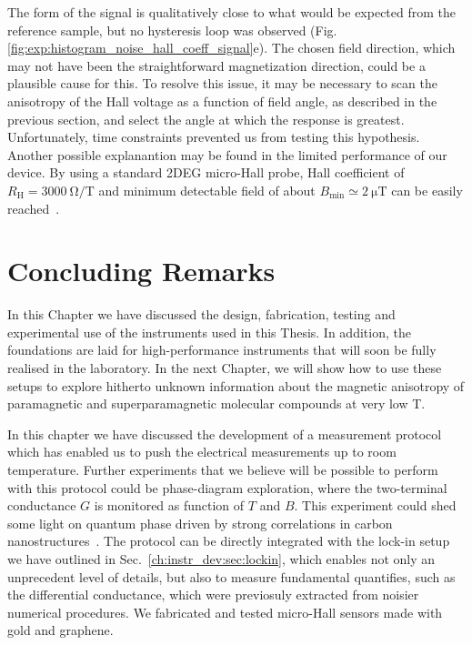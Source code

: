 %
The form of the signal is qualitatively close to what would be expected from the reference sample, but no hysteresis loop was observed (Fig.\ref{fig:exp:histogram_noise_hall_coeff_signal}e). The chosen field direction, which may not have been the straightforward magnetization direction, could be a plausible cause for this. To resolve this issue, it may be necessary to scan the anisotropy of the Hall voltage as a function of field angle, as described in the previous section, and select the angle at which the response is greatest. Unfortunately, time constraints prevented us from testing this hypothesis. Another possible explanantion may be found in the limited performance of our device. By using a standard 2DEG micro-Hall probe, Hall coefficient of $R_\textrm{H}=\SI{3000}{\ohm\per\tesla}$ and minimum detectable field of about $B_\textrm{min}\simeq\SI{2}{\micro\tesla}$ can be easily reached~\cite{candini2007phd}.

\section{Concluding Remarks}

In this Chapter we have discussed the design, fabrication, testing and experimental
use of the instruments used in this Thesis. In addition, the foundations are laid for
high-performance instruments that will soon be fully realised in the laboratory. In
the next Chapter, we will show how to use these setups to explore hitherto unknown
information about the magnetic anisotropy of paramagnetic and superparamagnetic
molecular compounds at very low T.

In this chapter we have discussed the development of a measurement protocol which has enabled us to push the electrical measurements up to room temperature. Further experiments that we believe  will be possible to perform with this protocol could be phase-diagram exploration, where the two-terminal conductance $G$ is monitored as function of $T$ and $B$. This experiment could shed some light on quantum phase driven by strong correlations in carbon nanostructures~\cite{paschen2021quantum, kim2017tunable, yankowitz2019tuning, kotov2012electron}. The protocol can be directly integrated with the lock-in setup we have outlined in Sec.~\ref{ch:instr_dev:sec:lockin}, which enables not only an unprecedent level of details, but also to measure fundamental quantifies, such as the differential conductance, which were previosuly extracted from noisier numerical procedures. We fabricated and tested micro-Hall sensors made with gold and graphene.

